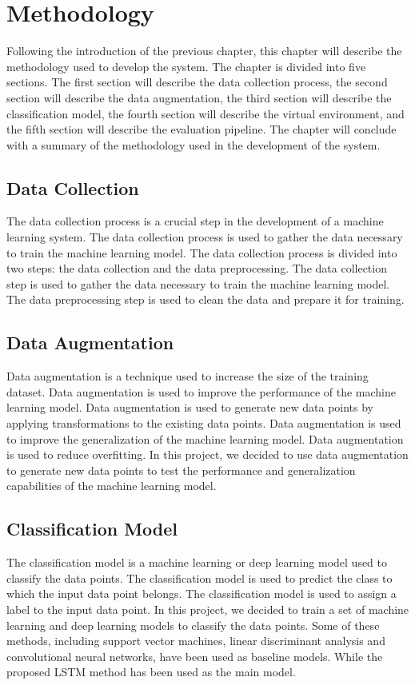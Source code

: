 \chapter{Methodology}\label{ch:methodology}
Following the introduction of the previous chapter, this chapter will describe the methodology used to develop the system.
The chapter is divided into five sections.
The first section will describe the data collection process, the second section will describe the data augmentation, the third section will describe the classification model, the fourth section will describe the virtual environment, and the fifth section will describe the evaluation pipeline.
The chapter will conclude with a summary of the methodology used in the development of the system.

\section{Data Collection}
The data collection process is a crucial step in the development of a machine learning system.
The data collection process is used to gather the data necessary to train the machine learning model.
The data collection process is divided into two steps: the data collection and the data preprocessing.
The data collection step is used to gather the data necessary to train the machine learning model.
The data preprocessing step is used to clean the data and prepare it for training.

\section{Data Augmentation}
Data augmentation is a technique used to increase the size of the training dataset.
Data augmentation is used to improve the performance of the machine learning model.
Data augmentation is used to generate new data points by applying transformations to the existing data points.
Data augmentation is used to improve the generalization of the machine learning model.
Data augmentation is used to reduce overfitting.
In this project, we decided to use data augmentation to generate new data points to test the performance and generalization capabilities of the machine learning model.

\section{Classification Model}
The classification model is a machine learning or deep learning model used to classify the data points.
The classification model is used to predict the class to which the input data point belongs.
The classification model is used to assign a label to the input data point.
In this project, we decided to train a set of machine learning and deep learning models to classify the data points.
Some of these methods, including support vector machines, linear discriminant analysis and convolutional neural networks, have been used as baseline models.
While the proposed LSTM method has been used as the main model.

